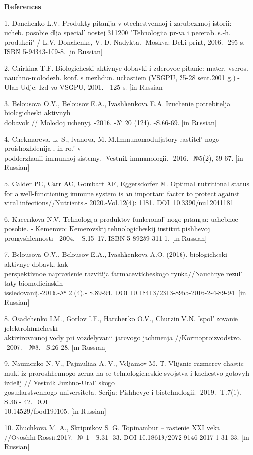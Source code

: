 \begin{center}
{\bfseries References}
\end{center}

\begin{references}
1. Donchenko L.V. Produkty pitanija v otechestvennoj i zarubezhnoj
istorii: ucheb. posobie dlja special' nostej 311200
"Tehnologija pr-va i pererab. s.-h. produkcii" / L.V. Donchenko, V. D.
Nadykta. -Moskva: DeLi print, 2006.- 295 s. ISBN 5-94343-109-8. {[}in
Russian{]}

2. Chirkina T.F. Biologicheski aktivnye dobavki i zdorovoe pitanie:
mater. vseros. nauchno-molodezh. konf. s mezhdun. uchastiem (VSGPU,
25-28 sent.2001 g.) - Ulan-Udje: Izd-vo VSGPU, 2001. - 125 s. {[}in
Russian{]}

3. Belousova O.V., Belousov E.A., Ivashhenkova E.A. Izuchenie
potrebitelja biologicheski aktivnyh \\dobavok // Molodoj uchenyj. -2016.
-№ 20 (124). -S.66-69. {[}in Russian{]}

4. Chekmareva, L. S., Ivanova, M. M.Immunomoduljatory
rastitel' nogo proishozhdenija i ih rol'{}
v \\podderzhanii immunnoj sistemy.- Vestnik immunologii. -2016.- №5(2),
59-67. {[}in Russian{]}

5. Calder PC, Carr AC, Gombart AF, Eggersdorfer M. Optimal nutritional
status for a well-functioning immune system is an important factor to
protect against viral infections//Nutrients.- 2020.-Vol.12(4): 1181.
DOI~\href{https://doi.org/10.3390/nu12041181}{10.3390/nu12041181}

6. Kacerikova N.V. Tehnologija produktov funkcional' nogo
pitanija: uchebnoe posobie. - Kemerovo: Kemerovskij tehnologicheskij
institut pishhevoj promyshlennosti. -2004. - S.15--17. ISBN
5-89289-311-1. {[}in Russian{]}

7. Belousova O.V., Belousov E.A., Ivashhenkova A.O. (2016). biologicheski
aktivnye dobavki kak \\perspektivnoe napravlenie razvitija
farmacevticheskogo rynka//Nauchnye rezul' taty
biomedicinskih \\issledovanij.-2016.-№ 2 (4).- S.89-94. DOI
10.18413/2313-8955-2016-2-4-89-94. {[}in Russian{]}

8. Osadchenko I.M., Gorlov I.F., Harchenko O.V., Churzin V.N.
Ispol' zovanie jelektrohimicheski \\aktivirovannoj vody pri
vozdelyvanii jarovogo jachmenja //Kormoproizvodstvo. -2007. - №8.
--S.26-28. {[}in Russian{]}

9. Naumenko N. V., Pajmulina A. V., Veljamov M. T. Vlijanie razmerov
chastic muki iz proroshhennogo zerna na ee tehnologicheskie svojstva i
kachestvo gotovyh izdelij // Vestnik Juzhno-Ural' skogo
\\gosudarstvennogo universiteta. Serija: Pishhevye i biotehnologii.
-2019.- T.7(1). - S.36 - 42. DOI \\10.14529/food190105. {[}in Russian{]}

10. Zhuchkova M. A., Skripnikov S. G. Topinambur -- rastenie XXI veka
//Ovoshhi Rossii.2017.- № 1.- S.31- 33. DOI
10.18619/2072-9146-2017-1-31-33. {[}in Russian{]}
\end{references}

